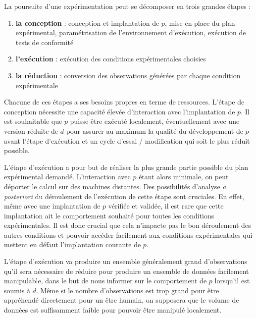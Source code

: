 La poursuite d'une expérimentation peut se décomposer en trois grandes étapes :
\begin{enumerate}
  \item \textbf{la conception} : conception et implantation de $p$, mise en place du plan expérimental, paramétrisation de l'environnement d'exécution, exécution de tests de conformité
  \item \textbf{l'exécution} : exécution des conditions expérimentales choisies
  \item \textbf{la réduction} : conversion des observations générées par chaque condition expérimentale
\end{enumerate}

Chacune de ces étapes a ses besoins propres en terme de ressources. L'étape de conception nécessite une capacité élevée d'interaction avec l'implantation de $p$. Il est souhaitable que $p$ puisse être exécuté localement, éventuellement avec une version réduite de $d$ pour assurer au maximum la qualité du développement de $p$ avant l'étape d'exécution et un cycle d'essai / modification qui soit le plus réduit possible.

L'étape d'exécution a pour but de réaliser la plus grande partie possible du plan expérimental demandé. L'interaction avec $p$ étant alors minimale, on peut déporter le calcul sur des machines distantes. Des possibilités d'analyse \textit{a posteriori} du déroulement de l'exécution de cette étape sont cruciales. En effet, même avec une implantation de $p$ vérifiée et validée, il est rare que cette implantation ait le comportement souhaité pour toutes les conditions expérimentales. Il est donc crucial que cela n'impacte pas le bon déroulement des autres conditions et pouvoir accéder facilement aux conditions expérimentales qui mettent en défaut l'implantation courante de $p$.

L'étape d'exécution va produire un ensemble généralement grand d'observations qu'il sera nécessaire de réduire pour produire un ensemble de données facilement manipulable, dans le but de nous informer sur le comportement de $p$ lorsqu'il est soumis à $d$. Même si le nombre d'observations est trop grand pour être appréhendé directement pour un être humain, on supposera que le volume de données est suffisamment faible pour pouvoir être manipulé localement.


